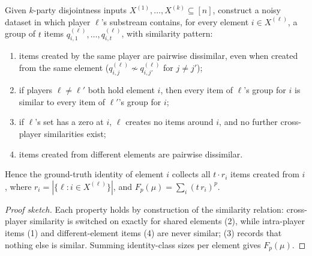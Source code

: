 \begin{lemma}\label{lem:cc-fp-embed}
Given $k$-party disjointness inputs $X^{(1)},\dots,X^{(k)} \subseteq [n]$, construct
a noisy dataset in which player $\ell$'s substream contains, for every element
$i \in X^{(\ell)}$, a group of $t$ items $q_{i,1}^{(\ell)},\dots,q_{i,t}^{(\ell)}$,
with similarity pattern:
\begin{enumerate}
\item items created by the same player are pairwise dissimilar, even when created
  from the same element ($q_{i,j}^{(\ell)} \not\sim q_{i,j'}^{(\ell)}$ for
  $j \ne j'$);
\item if players $\ell \ne \ell'$ both hold element $i$, then every item of $\ell$'s
  group for $i$ is similar to every item of $\ell'$'s group for $i$;
\item if $\ell$'s set has a zero at $i$, $\ell$ creates no items around $i$, and no
  further cross-player similarities exist;
\item items created from different elements are pairwise dissimilar.
\end{enumerate}
Hence the ground-truth identity of element $i$ collects all $t \cdot r_i$ items
created from $i$, where $r_i = |\{\ell : i \in X^{(\ell)}\}|$, and
$F_p(\mu) = \sum_{i} (t\,r_i)^p$. \eop
\end{lemma}

\begin{proof}[Proof sketch]
Each property holds by construction of the similarity relation: cross-player
similarity is switched on exactly for shared elements (2), while intra-player items
(1) and different-element items (4) are never similar; (3) records that nothing else
is similar. Summing identity-class sizes per element gives $F_p(\mu)$.
\end{proof}

